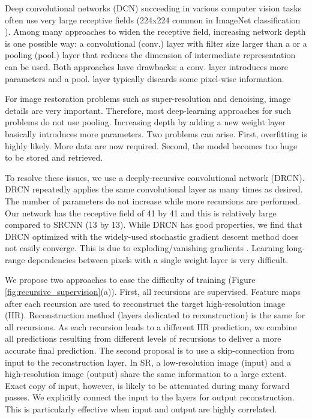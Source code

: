 \documentclass[10pt,twocolumn,letterpaper]{article}
\begin{document}
Deep convolutional networks (DCN) succeeding in various computer vision tasks often use very large receptive fields  (224x224 common in ImageNet classification \cite{krizhevsky2012imagenet, simonyan2015very}). Among many approaches to widen the receptive field, increasing network depth is one possible way: a convolutional (conv.) layer  with filter size larger than a  or a pooling (pool.) layer that reduces the dimension of intermediate representation can be used.  Both approaches have drawbacks: a conv. layer introduces more parameters and a pool. layer typically discards some pixel-wise information. 

For image restoration problems such as super-resolution and denoising, image details are very important. Therefore, most deep-learning approaches for such problems do not use pooling. Increasing depth by adding a new weight layer basically introduces more parameters. Two problems can arise. First, overfitting is highly likely. More data are now required. Second, the model becomes too huge to be stored and retrieved.





To resolve these issues, we use a deeply-recursive convolutional network (DRCN). DRCN repeatedly applies the same convolutional layer as many times as desired. The number of parameters do not increase while more recursions are performed. Our network has the receptive field of 41 by 41 and this is relatively large compared to SRCNN \cite{dong2014image} (13 by 13). While DRCN has good properties, we find that DRCN optimized with the widely-used stochastic gradient descent method does not easily converge. This is due to exploding/vanishing gradients \cite{bengio1994learning}. Learning long-range dependencies between pixels with a single weight layer is very difficult. 

We propose two approaches to ease the difficulty of training (Figure \ref{fig:recursive_supervision}(a)). First, all recursions are supervised. Feature maps after each recursion are used to reconstruct the target high-resolution image (HR). Reconstruction method (layers dedicated to reconstruction) is the same for all recursions. As each recursion leads to a different HR prediction, we combine all predictions resulting from different levels of recursions to deliver a more accurate final prediction. The second proposal is to use a skip-connection from input to the reconstruction layer. In SR, a low-resolution image (input) and a high-resolution image (output) share the same information to a large extent. Exact copy of input, however, is likely to be attenuated during many forward passes. We explicitly connect the input to the layers for output reconstruction. This is particularly effective when input and output are highly correlated.
\end{document}
